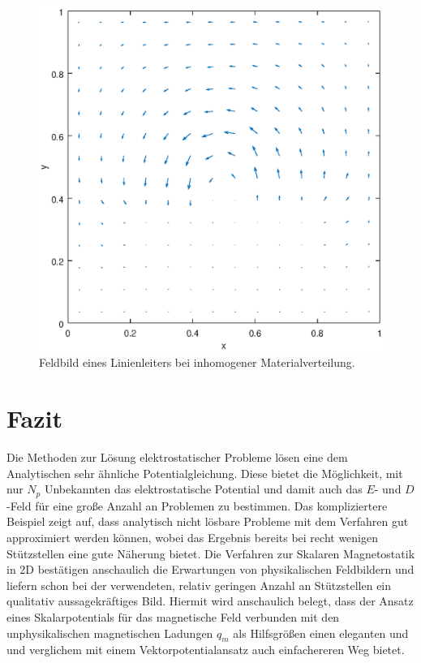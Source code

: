 \documentclass[./Protokollheft.tex]{subfiles}
\begin{document}
\begin{figure}[hp]
\begin{center}
\includegraphics[scale=0.7]{eps/plotMSinhomogen}
\end{center}
\caption{Feldbild eines Linienleiters bei inhomogener Materialverteilung.}
\label{fig:V4.PA10}
\end{figure}


\section{Fazit}

Die Methoden zur Lösung elektrostatischer Probleme lösen eine dem Analytischen sehr ähnliche Potentialgleichung. Diese bietet die Möglichkeit, mit nur $N_p$ Unbekannten das elektrostatische Potential und damit auch das $E$- und $D$-Feld für eine große Anzahl an Problemen zu bestimmen. Das kompliziertere Beispiel zeigt auf, dass analytisch nicht lösbare Probleme mit dem Verfahren gut approximiert werden können, wobei das Ergebnis bereits bei recht wenigen Stützstellen eine gute Näherung bietet. 
Die Verfahren zur Skalaren Magnetostatik in 2D bestätigen anschaulich die Erwartungen von physikalischen Feldbildern und liefern schon bei der verwendeten, relativ geringen Anzahl an Stützstellen ein qualitativ aussagekräftiges Bild. Hiermit wird anschaulich belegt, dass der Ansatz eines Skalarpotentials für das magnetische Feld verbunden mit den unphysikalischen magnetischen Ladungen $q_m$ als Hilfsgrößen einen eleganten und und verglichem mit einem Vektorpotentialansatz auch einfachereren Weg bietet.
\end{document}
